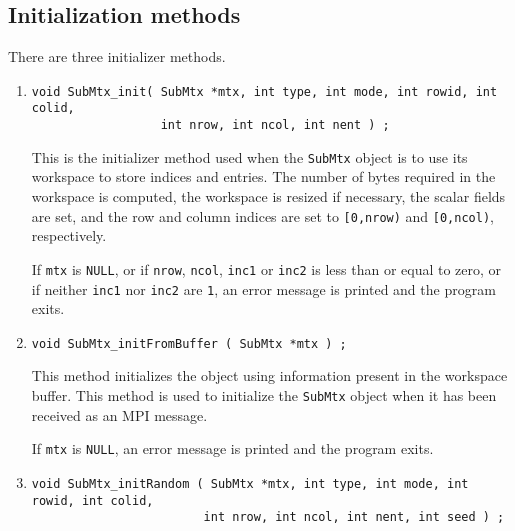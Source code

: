 \subsection{Initialization methods}
\label{subsection:SubMtx:proto:initial}
\par
There are three initializer methods.
\par
\begin{enumerate}
\item
\begin{verbatim}
void SubMtx_init( SubMtx *mtx, int type, int mode, int rowid, int colid,
                  int nrow, int ncol, int nent ) ;
\end{verbatim}
This is the initializer method used when the {\tt SubMtx}
object is to use its workspace to store indices and entries.
The number of bytes required in the workspace is computed,
the workspace is resized if necessary, the scalar fields are set,
and the row and column indices are set to {\tt [0,nrow)}
and {\tt [0,ncol)}, respectively.
\par {}
If {\tt mtx} is {\tt NULL},
or if {\tt nrow}, {\tt ncol}, {\tt inc1} or {\tt inc2}
is less than or equal to zero,
or if neither {\tt inc1} nor {\tt inc2} are {\tt 1},
an error message is printed and the program exits.
\item
\begin{verbatim}
void SubMtx_initFromBuffer ( SubMtx *mtx ) ;
\end{verbatim}
This method initializes the object using information present in the
workspace buffer.
This method is used to initialize the {\tt SubMtx} object when
it has been received as an MPI message.
\par {}
If {\tt mtx} is {\tt NULL},
an error message is printed and the program exits.
\item
\begin{verbatim}
void SubMtx_initRandom ( SubMtx *mtx, int type, int mode, int rowid, int colid,
                        int nrow, int ncol, int nent, int seed ) ;
\end{verbatim}

\end{enumerate}
